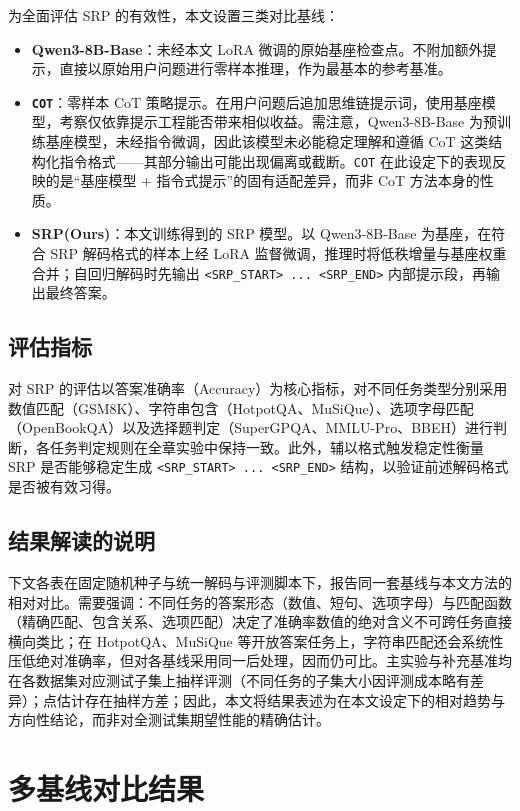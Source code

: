为全面评估 SRP 的有效性，本文设置三类对比基线：

\begin{itemize}
    \item \textbf{Qwen3-8B-Base}：未经本文 LoRA 微调的原始基座检查点。不附加额外提示，直接以原始用户问题进行零样本推理，作为最基本的参考基准。
    \item \textbf{\texttt{COT}}：零样本 CoT 策略提示。在用户问题后追加思维链提示词，使用基座模型，考察仅依靠提示工程能否带来相似收益。需注意，Qwen3-8B-Base 为预训练基座模型，未经指令微调，因此该模型未必能稳定理解和遵循 CoT 这类结构化指令格式——其部分输出可能出现偏离或截断。\texttt{COT} 在此设定下的表现反映的是``基座模型 + 指令式提示''的固有适配差异，而非 CoT 方法本身的性质。
    \item \textbf{SRP(Ours)}：本文训练得到的 SRP 模型。以 Qwen3-8B-Base 为基座，在符合 SRP 解码格式的样本上经 LoRA 监督微调，推理时将低秩增量与基座权重合并；自回归解码时先输出 \texttt{<SRP\_START> ... <SRP\_END>} 内部提示段，再输出最终答案。
\end{itemize}

\subsection{评估指标}

对 SRP 的评估以答案准确率（Accuracy）为核心指标，对不同任务类型分别采用数值匹配（GSM8K）、字符串包含（HotpotQA、MuSiQue）、选项字母匹配（OpenBookQA）以及选择题判定（SuperGPQA、MMLU-Pro、BBEH）进行判断，各任务判定规则在全章实验中保持一致。此外，辅以格式触发稳定性衡量 SRP 是否能够稳定生成 \texttt{<SRP\_START> ... <SRP\_END>} 结构，以验证前述解码格式是否被有效习得。

\subsection{结果解读的说明}

下文各表在固定随机种子与统一解码与评测脚本下，报告同一套基线与本文方法的相对对比。需要强调：不同任务的答案形态（数值、短句、选项字母）与匹配函数（精确匹配、包含关系、选项匹配）决定了准确率数值的绝对含义不可跨任务直接横向类比；在 HotpotQA、MuSiQue 等开放答案任务上，字符串匹配还会系统性压低绝对准确率，但对各基线采用同一后处理，因而仍可比。主实验与补充基准均在各数据集对应测试子集上抽样评测（不同任务的子集大小因评测成本略有差异）；点估计存在抽样方差；因此，本文将结果表述为在本文设定下的相对趋势与方向性结论，而非对全测试集期望性能的精确估计。

\section{多基线对比结果}

